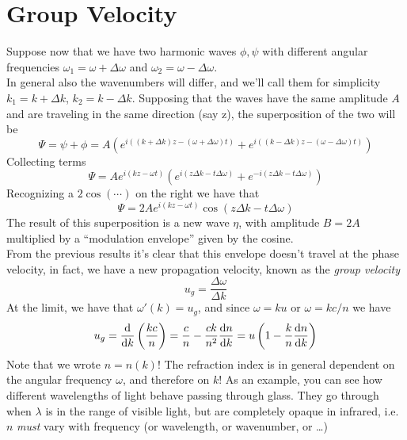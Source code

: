 \documentclass[../electromagnetism.tex]{subfiles}
\begin{document}
\section{Group Velocity}
Suppose now that we have two harmonic waves $\phi,\psi$ with different angular frequencies $\omega_1=\omega+\Delta\omega$ and $\omega_2=\omega-\Delta\omega$.\\
In general also the wavenumbers will differ, and we'll call them for simplicity $k_1=k+\Delta k$, $k_2=k-\Delta k$. Supposing that the waves have the same amplitude $A$ and are traveling in the same direction (say z), the superposition of the two will be
\begin{equation*}
	\Psi=\psi+\phi=A\left( e^{i\left( (k+\Delta k)z-(\omega+\Delta\omega)t \right)}+e^{i\left( (k-\Delta k)z-(\omega-\Delta\omega)t \right)} \right)
\end{equation*}
Collecting terms 
\begin{equation*}
	\Psi=Ae^{i\left( kz-\omega t \right)}\left( e^{i\left( z\Delta k-t\Delta\omega \right)}+e^{-i\left( z\Delta k-t\Delta\omega \right)} \right)
\end{equation*}
Recognizing a $2\cos(\cdots)$ on the right we have that
\begin{equation*}
	\Psi=2Ae^{i\left( kz-\omega t \right)}\cos\left( z\Delta k-t\Delta\omega \right)
\end{equation*}
The result of this superposition is a new wave $\eta$, with amplitude $B=2A$ multiplied by a ``modulation envelope'' given by the cosine.\\
From the previous results it's clear that this envelope doesn't travel at the phase velocity, in fact, we have a new propagation velocity, known as the \textit{group velocity}
\begin{equation}
	u_g=\frac{\Delta\omega}{\Delta k}
	\label{eq:groupvelwaves}
\end{equation}
At the limit, we have that $\omega'(k)=u_g$, and since $\omega=ku$ or $\omega=kc/n$ we have
\begin{equation*}
	u_g=\dv{k}\left( \frac{kc}{n} \right)=\frac{c}{n}-\frac{ck}{n^2}\dv{n}{k}=u\left( 1-\frac{k}{n}\dv{n}{k} \right)
\end{equation*}
Note that we wrote $n=n(k)$! The refraction index is in general dependent on the angular frequency $\omega$, and therefore on $k$! As an example, you can see how different wavelengths of light behave passing through glass. They go through when $\lambda$ is in the range of visible light, but are completely opaque in infrared, i.e. $n$ \emph{must} vary with frequency (or wavelength, or wavenumber, or \ldots)\\
\end{document}
